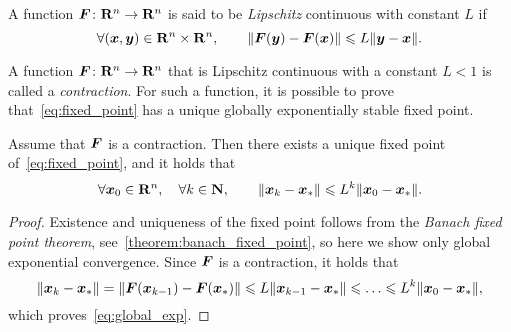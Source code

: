 \begin{definition}
    A function $\mathbf{\boldsymbol{F}}\colon \mathbf R^n \to \mathbf R^n$ is said to be \emph{Lipschitz} continuous
    with constant $L$ if
    \[
        \forall (\vect x, \vect y) \in \real^n \times \real^n, \qquad
        \norm[big]{\vect F(\vect y) - \vect F(\vect x)} \leq L \norm{\vect y - \vect x}.
    \]
\end{definition}
A function $\mathbf{\boldsymbol{F}}\colon \mathbf R^n \to \mathbf R^n$ that is Lipschitz continuous with a constant $L < 1$ is called a \emph{contraction}.
For such a function, it is possible to prove that~\eqref{eq:fixed_point} has a unique globally exponentially stable fixed point.
\begin{theorem}
    \label{theorem:exponential_convergence_fixed_point}
    Assume that $\mathbf{\boldsymbol{F}}$ is a contraction.
    Then there exists a unique fixed point of~\eqref{eq:fixed_point},
    and it holds that
    \begin{equation}
        \label{eq:global_exp}
        \forall \mathbf{\boldsymbol{x}}_0 \in \mathbf R^n,
        \quad \forall k \in \mathbf N, \qquad
        \lVert\mathbf{\boldsymbol{x}}_k - \mathbf{\boldsymbol{x}}_*\rVert \leqslant L^k \lVert\mathbf{\boldsymbol{x}}_0 - \mathbf{\boldsymbol{x}}_*\rVert.
    \end{equation}
\end{theorem}
\begin{proof}
    Existence and uniqueness of the fixed point follows from the \emph{Banach fixed point theorem},
    see~\cref{theorem:banach_fixed_point},
    so here we show only global exponential convergence.
    Since $\mathbf{\boldsymbol{F}}$ is a contraction,
    it holds that
    \begin{equation}
        \label{eq:contraction}
        \norm[big]{\vect x_{k} - \vect x_{*}}
        = \norm[big]{\vect F(\vect x_{k-1}) - \vect F(\vect x_*)}
        \leq L\norm{\vect x_{k-1} - \vect x_*}
        \leq \dots \leq L^{k} \norm{\vect x_{0} - \vect x_*},
    \end{equation}
    which proves~\eqref{eq:global_exp}.
\end{proof}

